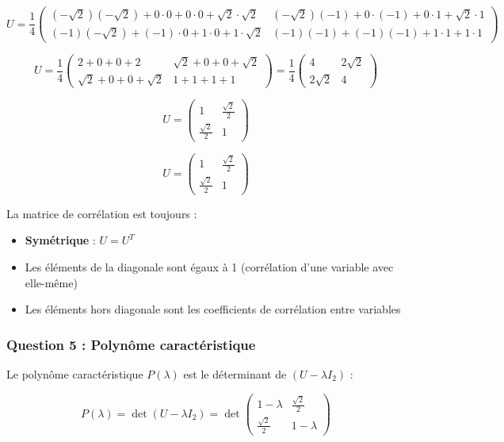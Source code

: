 \documentclass[11pt,a4paper]{article}
\begin{document}
$$U = \frac{1}{4} \begin{pmatrix}
(-\sqrt{2})(-\sqrt{2}) + 0 \cdot 0 + 0 \cdot 0 + \sqrt{2} \cdot \sqrt{2} & (-\sqrt{2})(-1) + 0 \cdot (-1) + 0 \cdot 1 + \sqrt{2} \cdot 1 \\
(-1)(-\sqrt{2}) + (-1) \cdot 0 + 1 \cdot 0 + 1 \cdot \sqrt{2} & (-1)(-1) + (-1)(-1) + 1 \cdot 1 + 1 \cdot 1
\end{pmatrix}$$

$$U = \frac{1}{4} \begin{pmatrix}
2 + 0 + 0 + 2 & \sqrt{2} + 0 + 0 + \sqrt{2} \\
\sqrt{2} + 0 + 0 + \sqrt{2} & 1 + 1 + 1 + 1
\end{pmatrix} = \frac{1}{4} \begin{pmatrix}
4 & 2\sqrt{2} \\
2\sqrt{2} & 4
\end{pmatrix}$$

$$U = \begin{pmatrix}
1 & \frac{\sqrt{2}}{2} \\
\frac{\sqrt{2}}{2} & 1
\end{pmatrix}$$

$$\boxed{U = \begin{pmatrix}
1 & \frac{\sqrt{2}}{2} \\
\frac{\sqrt{2}}{2} & 1
\end{pmatrix}}$$

\begin{astucebox}
La matrice de corrélation est toujours :
\begin{itemize}
    \item \textbf{Symétrique} : $U = U^T$
    \item Les éléments de la diagonale sont égaux à 1 (corrélation d'une variable avec elle-même)
    \item Les éléments hors diagonale sont les coefficients de corrélation entre variables
\end{itemize}
\end{astucebox}

\subsubsection{Question 5 : Polynôme caractéristique}

Le polynôme caractéristique $P(\lambda)$ est le déterminant de $(U - \lambda I_2)$ :

$$P(\lambda) = \det(U - \lambda I_2) = \det\begin{pmatrix}
1 - \lambda & \frac{\sqrt{2}}{2} \\
\frac{\sqrt{2}}{2} & 1 - \lambda
\end{pmatrix}$$
\end{document}
